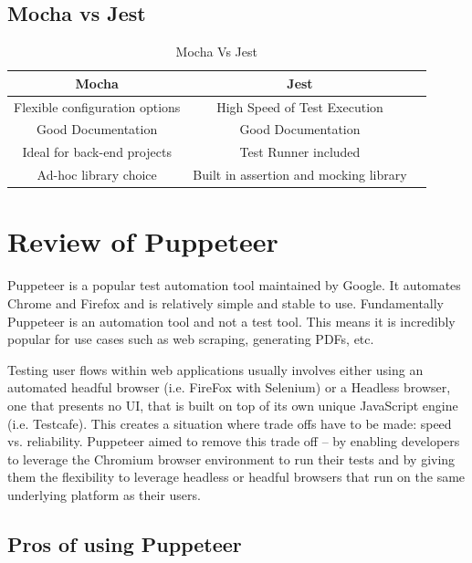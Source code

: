 \documentclass[12pt,a4paper,titlepage]{report}
\begin{document}
\subsection{Mocha vs Jest}

\begin{table}[H]
  \centering
  \small
  \setlength\tabcolsep{6pt}
  \begin{tabular}{|c|c|c}
    \hline \textbf
    {Mocha}              & \textbf {Jest}               \\
    \hline\hline
    Flexible configuration options & High Speed of Test Execution           \\
    \hline
    Good Documentation             & Good Documentation                     \\
    \hline
    Ideal for back-end projects    & Test Runner included                   \\
    \hline
    Ad-hoc library choice          & Built in assertion and mocking library \\
    \hline
  \end{tabular}
  \caption{Mocha Vs Jest}
  \label{table:mocha:jest}
\end{table}

\section{Review of Puppeteer}

Puppeteer is a popular test automation tool maintained by Google. It automates Chrome and Firefox and is relatively simple and stable to use.
Fundamentally Puppeteer is an automation tool and not a test tool.
This means it is incredibly popular for use cases such as web scraping, generating PDFs, etc.

Testing user flows within web applications usually involves either using an automated headful
browser (i.e. FireFox with Selenium) or a Headless browser, one that presents no UI, that is built on top of its own unique JavaScript
engine (i.e. Testcafe). This creates a situation where trade offs have to be made: speed vs. reliability.
Puppeteer aimed to remove this trade off – by enabling developers to leverage the Chromium browser environment
to run their tests and by giving them the flexibility to leverage headless or headful browsers that run on the same underlying platform as their users.

\subsection{Pros of using Puppeteer}
\end{document}
